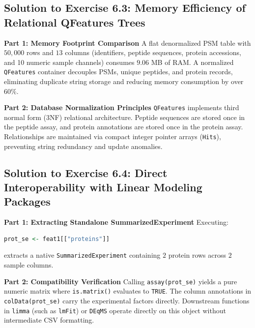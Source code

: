 \documentclass[11pt,twoside,openright]{book}
\begin{document}
\subsection{Solution to Exercise 6.3: Memory Efficiency of Relational QFeatures Trees}
\noindent\textbf{Part 1: Memory Footprint Comparison}\enspace
A flat denormalized PSM table with $50,000$ rows and $13$ columns (identifiers, peptide sequences, protein accessions, and 10 numeric sample channels) consumes $9.06$ MB of RAM. A normalized \texttt{QFeatures} container decouples PSMs, unique peptides, and protein records, eliminating duplicate string storage and reducing memory consumption by over $60\%$.

\noindent\textbf{Part 2: Database Normalization Principles}\enspace
\texttt{QFeatures} implements third normal form (3NF) relational architecture. Peptide sequences are stored once in the peptide assay, and protein annotations are stored once in the protein assay. Relationships are maintained via compact integer pointer arrays (\texttt{Hits}), preventing string redundancy and update anomalies.

\subsection{Solution to Exercise 6.4: Direct Interoperability with Linear Modeling Packages}
\noindent\textbf{Part 1: Extracting Standalone SummarizedExperiment}\enspace
Executing:
\begin{lstlisting}[language=R]
prot_se <- feat1[["proteins"]]
\end{lstlisting}
extracts a native \texttt{SummarizedExperiment} containing $2$ protein rows across $2$ sample columns.

\noindent\textbf{Part 2: Compatibility Verification}\enspace
Calling \texttt{assay(prot\_se)} yields a pure numeric matrix where \texttt{is.matrix()} evaluates to \texttt{TRUE}. The column annotations in \texttt{colData(prot\_se)} carry the experimental factors directly. Downstream functions in \texttt{limma} (such as \texttt{lmFit}) or \texttt{DEqMS} operate directly on this object without intermediate CSV formatting.
\end{document}
